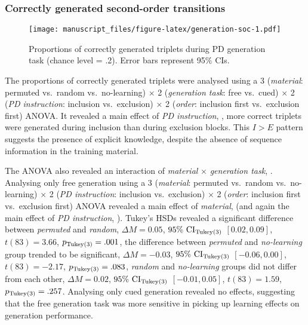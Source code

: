 \documentclass[
  english,
  man]{apa6}
\begin{document}
\hypertarget{correctly-generated-second-order-transitions}{%
\subsubsection{Correctly generated second-order transitions}\label{correctly-generated-second-order-transitions}}



\begin{figure}
\centering
\texttt{[image: manuscript\_files/figure-latex/generation-soc-1.pdf]}
\caption{\label{fig:generation-soc}Proportions of correctly generated triplets during PD generation task (chance level = .2). Error bars represent 95\% CIs.}
\end{figure}

The proportions of correctly generated triplets were analysed using a 3 (\emph{material}: permuted vs.~random vs.~no-learning) \(\times\) 2 (\emph{generation task}: free vs.~cued) \(\times\) 2 (\emph{PD instruction}: inclusion vs.~exclusion) \(\times\) 2 (\emph{order}: inclusion first vs.~exclusion first) ANOVA.
It revealed a main effect of \emph{PD instruction}, , more correct triplets were generated during inclusion than during exclusion blocks.
This \(I > E\) pattern suggests the presence of explicit knowledge, despite the absence of sequence information in the training material.

The ANOVA also revealed an interaction of \emph{material} \(\times\) \emph{generation task}, .
Analysing only free generation using a 3 (\emph{material}: permuted vs.~random vs.~no-learning) \(\times\) 2 (\emph{PD instruction}: inclusion vs.~exclusion) \(\times\) 2 (\emph{order}: inclusion first vs.~exclusion first) ANOVA revealed a main effect of \emph{material}, (and again the main effect of \emph{PD instruction}, ).
Tukey's HSDs revealed a significant difference between \emph{permuted} and \emph{random}, \(\Delta M = 0.05\), \(95\%\ \mathrm{CI}_\mathrm{\scriptsize Tukey(3)}\) \([0.02, 0.09]\), \(t(83) = 3.66\), \(p_\mathrm{\scriptsize Tukey(3)} = .001\), the difference between \emph{permuted} and \emph{no-learning} group trended to be significant, \(\Delta M = -0.03\), \(95\%\ \mathrm{CI}_\mathrm{\scriptsize Tukey(3)}\) \([-0.06, 0.00]\), \(t(83) = -2.17\), \(p_\mathrm{\scriptsize Tukey(3)} = .083\), \emph{random} and \emph{no-learning} groups did not differ from each other, \(\Delta M = 0.02\), \(95\%\ \mathrm{CI}_\mathrm{\scriptsize Tukey(3)}\) \([-0.01, 0.05]\), \(t(83) = 1.59\), \(p_\mathrm{\scriptsize Tukey(3)} = .257\).
Analysing only cued generation revealed no effects, suggesting that the free generation task was more sensitive in picking up learning effects on generation performance.
\end{document}
